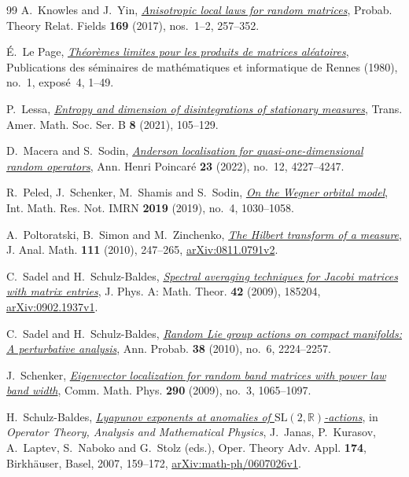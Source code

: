 \documentclass[11pt]{article}
\numberwithin{equation}{section}
\theoremstyle{remark}
\newcommand{\R}{\mathbb R}
\begin{document}
\begin{thebibliography}{99}
A.~Knowles and J.~Yin, \href{https://doi.org/10.1007/s00440-016-0730-4}{\emph{Anisotropic local laws for random matrices}},
Probab. Theory Relat. Fields \textbf{169} (2017), nos.~1--2, 257--352.

\'E.~Le Page,
\href{https://www.numdam.org/item/PSMIR_1980___1_A4_0/}{\emph{Th\'eor\`emes limites pour les produits de matrices al\'eatoires}},
Publications des s\'eminaires de math\'ematiques et informatique de Rennes
(1980), no.~1, expos\'e~4, 1--49.

P.~Lessa,
\href{https://doi.org/10.1090/btran/60}{\emph{Entropy and dimension of disintegrations of stationary measures}},
Trans. Amer. Math. Soc. Ser. B \textbf{8} (2021), 105--129.

D.~Macera and S.~Sodin,
\href{https://doi.org/10.1007/s00023-022-01191-z}{\emph{Anderson localisation for quasi-one-dimensional random operators}},
Ann. Henri Poincar\'e \textbf{23} (2022), no.~12, 4227--4247.

R.~Peled, J.~Schenker, M.~Shamis and S.~Sodin,
\href{https://doi.org/10.1093/imrn/rnx145}{\emph{On the Wegner orbital model}},
Int. Math. Res. Not. IMRN \textbf{2019} (2019), no.~4, 1030--1058.

A.~Poltoratski, B.~Simon and M.~Zinchenko,
\href{https://doi.org/10.1007/s11854-010-0017-0}{\emph{The Hilbert transform of a measure}},
J. Anal. Math. \textbf{111} (2010), 247--265,
\href{https://arxiv.org/abs/0811.0791v2}{arXiv:0811.0791v2}.

C.~Sadel and H.~Schulz-Baldes,
\href{https://doi.org/10.1088/1751-8113/42/18/185204}{\emph{Spectral averaging techniques for Jacobi matrices with matrix entries}},
J. Phys. A: Math. Theor. \textbf{42} (2009), 185204,
\href{https://arxiv.org/abs/0902.1937v1}{arXiv:0902.1937v1}.

C.~Sadel and H.~Schulz-Baldes,
\href{https://doi.org/10.1214/10-AOP544}{\emph{Random Lie group actions on compact manifolds:
A perturbative analysis}},
Ann. Probab. \textbf{38} (2010), no.~6, 2224--2257.

J.~Schenker,
\href{https://doi.org/10.1007/s00220-009-0798-0}{\emph{Eigenvector localization for random band matrices with power law band width}},
Comm. Math. Phys. \textbf{290} (2009), no.~3, 1065--1097.

H.~Schulz-Baldes, \href{https://doi.org/10.1007/978-3-7643-8135-6_10}{\emph{Lyapunov exponents at anomalies of $\mathrm{SL}(2,\R)$-actions}},
in \emph{Operator Theory, Analysis and Mathematical Physics},
J.~Janas, P.~Kurasov, A.~Laptev, S.~Naboko and G.~Stolz (eds.),
Oper. Theory Adv. Appl. \textbf{174}, Birkh\"auser, Basel, 2007, 159--172,
\href{https://arxiv.org/abs/math-ph/0607026v1}{arXiv:math-ph/0607026v1}.


\end{thebibliography}
\end{document}
